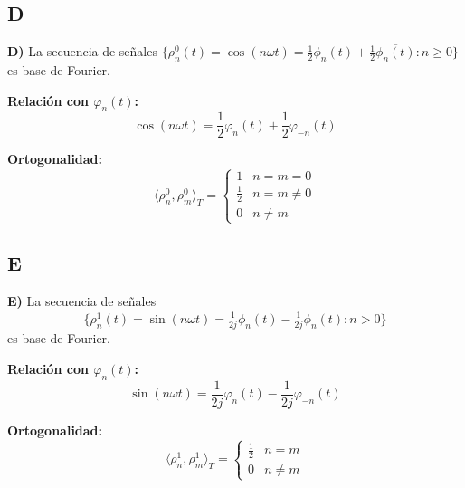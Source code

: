 \vspace{0.5cm}

\subsection{D}

\textbf{D)} La secuencia de señales $\{ \rho_n^0(t) = \cos(n\omega t) = \tfrac{1}{2}\phi_n(t) + \tfrac{1}{2}\overline{\phi_n(t)} : n \geq 0 \}$ es base de Fourier.

\textbf{Relación con $\varphi_n(t)$:}
\[
\cos(n\omega t) = \frac{1}{2}\varphi_n(t) + \frac{1}{2}\varphi_{-n}(t)
\]

\textbf{Ortogonalidad:}
\[
\langle \rho_n^0, \rho_m^0 \rangle_T = 
\begin{cases}
1 & n = m = 0 \\
\frac{1}{2} & n = m \neq 0 \\
0 & n \neq m
\end{cases}
\]

\vspace{0.5cm}

\subsection{E}

\textbf{E)} La secuencia de señales \[\{ \rho_n^1(t) = \sin(n\omega t) = \tfrac{1}{2j}\phi_n(t) - \tfrac{1}{2j}\overline{\phi_n(t)} : n > 0 \}\] es base de Fourier.

\textbf{Relación con $\varphi_n(t)$:}
\[
\sin(n\omega t) = \frac{1}{2j}\varphi_n(t) - \frac{1}{2j}\varphi_{-n}(t)
\]

\textbf{Ortogonalidad:}
\[
\langle \rho_n^1, \rho_m^1 \rangle_T = 
\begin{cases}
\frac{1}{2} & n = m \\
0 & n \neq m
\end{cases}
\]

